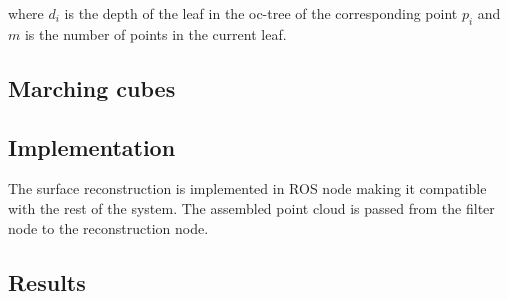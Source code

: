 \noindent where $d_i$ is the depth of the leaf in the oc-tree of the corresponding point $p_i$ and $m$ is the number of points in the current leaf.

\subsection{Marching cubes}

\subsection{Implementation}
The surface reconstruction is implemented in ROS node making it compatible with the rest of the system. The assembled point cloud is passed from the filter node to the reconstruction node.

\subsection{Results}